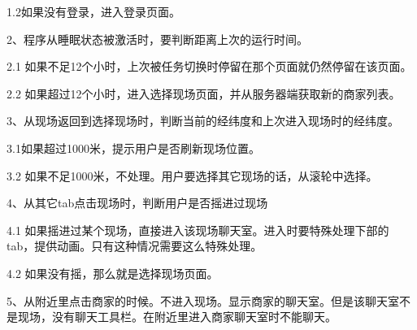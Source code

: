 \documentclass[cs4size]{ctexartutf8}
\begin{document}
1.2如果没有登录，进入登录页面。


2、程序从睡眠状态被激活时，要判断距离上次的运行时间。

2.1 如果不足12个小时，上次被任务切换时停留在那个页面就仍然停留在该页面。

2.2 如果超过12个小时，进入选择现场页面，并从服务器端获取新的商家列表。


3、从现场返回到选择现场时，判断当前的经纬度和上次进入现场时的经纬度。

3.1如果超过1000米，提示用户是否刷新现场位置。

3.2 如果不足1000米，不处理。用户要选择其它现场的话，从滚轮中选择。


4、从其它tab点击现场时，判断用户是否摇进过现场

4.1 如果摇进过某个现场，直接进入该现场聊天室。进入时要特殊处理下部的tab，提供动画。只有这种情况需要这么特殊处理。

4.2 如果没有摇，那么就是选择现场页面。


5、从附近里点击商家的时候。不进入现场。显示商家的聊天室。但是该聊天室不是现场，没有聊天工具栏。在附近里进入商家聊天室时不能聊天。



\newpage
\end{document}

